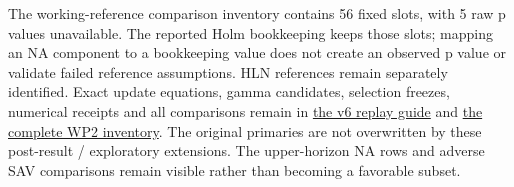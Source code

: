 The working-reference comparison inventory contains 56 fixed slots,
with 5 raw p values unavailable.
The reported Holm bookkeeping keeps those slots; mapping an NA component to a
bookkeeping value does not create an observed p value or validate failed
reference assumptions. HLN references remain separately identified.
Exact update equations, gamma candidates, selection freezes,
numerical receipts and all comparisons remain in
\href{https://github.com/ByronLi0207/financial-mathematics-paper-20261020/blob/revision-v7-final/protocol/revision-v6/REPLAY.md}{the v6 replay guide} and
\href{https://github.com/ByronLi0207/financial-mathematics-paper-20261020/blob/revision-v7-final/results/revision-20261023/v6/wp2-summary.json}{the complete WP2 inventory}.
The original primaries are not overwritten by these post-result / exploratory
extensions. The upper-horizon NA rows and adverse SAV comparisons remain
visible rather than becoming a favorable subset.